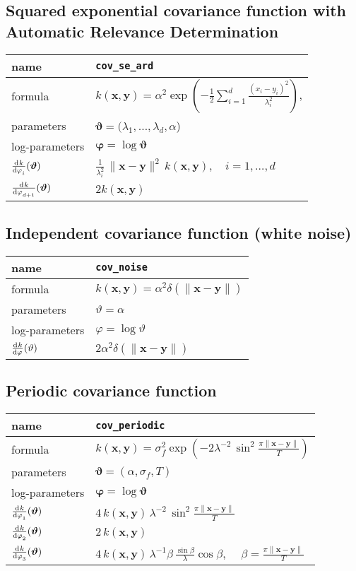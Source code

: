 \documentclass{article}
\newcommand{\NL}{\\ \midrule} %
\newcommand{\bx}{\bm{x}}
\newcommand{\by}{\bm{y}}
\newcommand{\btheta}{\bm{\vartheta}}
\newcommand{\bphi}{\bm{\varphi}}
\begin{document}
\subsection{Squared exponential covariance function with Automatic Relevance Determination}

\begin{tabularx}{\textwidth}{@{} X X @{}}
%
name & \verb|cov_se_ard|  \NL
 formula &  $ k(\bx,\by) = \displaystyle \alpha^2 \exp\left( -\frac{1}{2} \sum_{i=1}^d  \frac{(x_i-y_i)^2}{\lambda_i^2} \right) $,  \NL
% 
parameters & $ \btheta = (\lambda_1,\ldots,\lambda_d,\alpha$)  \NL
% 
log-parameters & $ \bphi = \log \btheta$ \NL
%
$\displaystyle \od{k}{\varphi_i}(\btheta) $ & $\displaystyle \frac{1}{\lambda_{i}^2}  \, \|\bx-\by\|^2 \, k(\bx,\by) , \quad i=1,\ldots,d$ \NL
$\displaystyle \od{k}{\varphi_{d+1}}(\btheta)$ & $2k(\bx,\by)$ \NL
%
\end{tabularx}








\subsection{Independent covariance function (white noise)}

\begin{tabularx}{\textwidth}{@{} X X @{}}
%
 name & \verb|cov_noise|  \NL
 formula &  $k(\bx,\by) = \alpha^2 \delta(\|\bm{x}-\bm{y}\|) $  \NL
% 
parameters & $\vartheta = \alpha$  \NL
% 
log-parameters & $\varphi = \log \vartheta $ \NL
%
$\displaystyle \od{k}{\varphi}(\vartheta)$ & $2\alpha^2 \delta(\|\bm{x}-\bm{y}\|)$ \NL
%
\end{tabularx}






\subsection{Periodic covariance function}

\begin{tabularx}{\textwidth}{@{} X X @{}}
%
 name & \verb|cov_periodic|  \NL
 formula &  $\displaystyle k(\bx,\by) = \sigma_f^2 \exp \left ( -2  \lambda^{-2} \, \sin^2 \frac{\pi \|\bm{x}-\bm{y}\|}{T}   \right)$  \NL
% 
parameters & $\btheta = (\alpha, \sigma_f, T )$  \NL
% 
log-parameters & $\displaystyle \bphi = \log \btheta $ \NL
%
$\displaystyle \od{k}{\varphi_1}(\btheta)$ &   $\displaystyle 4 \,  k(\bx,\by) \, \lambda^{-2} \, \sin^2 \frac{\pi \|\bm{x}-\bm{y}\|}{T}   $ \NL
$\displaystyle \od{k}{\varphi_2}(\btheta)$ & $\displaystyle 2 \,  k(\bx,\by)  $ \NL
$\displaystyle \od{k}{\varphi_3}(\btheta)$ &  $\displaystyle 4 \,  k(\bx,\by) \, \lambda^{-1} \beta \, \frac{\sin \beta}{\lambda} \cos \beta $, $\quad \beta =  \frac{\pi \|\bm{x}-\bm{y}\|}{T}   $\NL
%
\end{tabularx}
\end{document}
